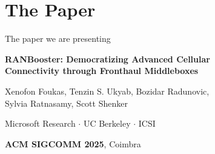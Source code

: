 
\section[The paper]{The Paper}

\begin{frame}{The paper we are presenting}
  \vspace{0.6em}
  \centering
  {\large\textbf{RANBooster: Democratizing Advanced Cellular}\\[2pt]
   \textbf{Connectivity through Fronthaul Middleboxes}\par}

  \vspace{0.8em}
  {\small Xenofon Foukas, Tenzin S. Ukyab, Bozidar Radunovic,\\[2pt]
   Sylvia Ratnasamy, Scott Shenker\par}

  \vspace{0.5em}
  {\small\textcolor{softgray}{Microsoft Research \quad $\cdot$ \quad UC Berkeley
   \quad $\cdot$ \quad ICSI}\par}

  \vspace{0.9em}
  {\small\textbf{ACM SIGCOMM 2025}, Coimbra\par}

  \vspace{1.0em}

\end{frame}
